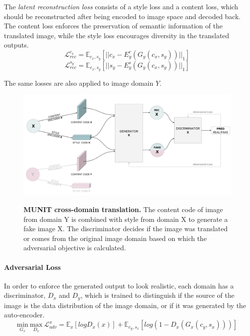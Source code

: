 \documentclass[12pt]{report}
\begin{document}
The \textit{latent reconstruction loss} consists of a style loss and a content loss, which should be reconstructed after being encoded to image space and decoded back. The content loss enforces the preservation of semantic information of the translated image, while the style loss encourages diversity in the translated outputs.
\begin{equation}
\mathcal{L}^{c_{x}}_{rec} = \mathbb{E}_{c_{x}, s_{y}}[||c_{x} - E^{c}_{y}(G_{y}(c_{x},s_{y}))||_{1}]
\end{equation}
\begin{equation}
\mathcal{L}^{s_{y}}_{rec} = \mathbb{E}_{c_{x}, s_{y}}[||s_{y} - E^{s}_{y}(G_{y}(c_{x},s_{y}))||_{1}]
\end{equation}

The same losses are also applied to image domain $Y$.

\begin{figure}[h]
\centering
{\includegraphics[width=\linewidth]{03_analysis/gans/munit_adv}}
\caption{\label{fig:munit_adv} \textbf{MUNIT cross-domain translation.} The content code of image from domain Y is combined with style from domain X to generate a fake image X. The discriminator decides if the image was translated or comes from the original image domain based on which the adversarial objective is calculated.}
\end{figure}

\paragraph{Adversarial Loss}
In order to enforce the generated output to look realistic, each domain has a discriminator, $D_x$ and $D_y$, which is trained to distinguish if the source of the image is the data distribution of the image domain, or if it was generated by the auto-encoder.
\begin{equation}
\underset{G_x}{\mathrm{min}} \ \underset{D_x}{\mathrm{max}} \ \mathcal{L}^{x}_{adv} = \mathbb{E}_{x}[logD_{x}(x)] + \mathbb{E}_{c_{y}, s_{x}}[log(1 - D_{x}(G_{x}(c_{y}, s_{x})))]
\end{equation}
\end{document}
